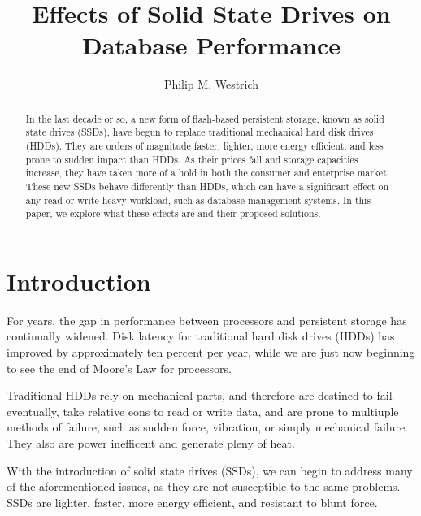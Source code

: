 \documentclass[format=acmsmall, review=false, screen=true]{acmart}
\begin{document}
\title[Effects of SSDs on Databases]{Effects of Solid State Drives on Database Performance}  
\author{Philip M. Westrich}

\begin{abstract}

    In the last decade or so, a new form of flash-based persistent storage, known as solid state drives (SSDs), have begun 
    to replace traditional mechanical hard disk drives (HDDs). They are orders of magnitude faster, lighter, more energy 
    efficient, and less prone to sudden impact than HDDs. As their prices fall and storage capacities increase, they have 
    taken more of a hold in both the consumer and enterprise market. These new SSDs behave differently than HDDs, which can 
    have a significant effect on any read or write heavy workload, such as database management systems. In this paper, we explore 
    what these effects are and their proposed solutions.
 
\end{abstract}

\maketitle

\section{Introduction}

For years, the gap in performance between processors and persistent storage has continually widened. Disk latency for 
traditional hard disk drives (HDDs) has improved by approximately ten percent per year, while we are just now beginning 
to see the end of Moore's Law for processors. \cite{Xie2011}

Traditional HDDs rely on mechanical parts, and therefore are destined to fail eventually, take relative eons to read 
or write data, and are prone to multiuple methods of failure, such as sudden force, vibration, or simply mechanical 
failure. They also are power inefficent and generate pleny of heat. \cite{Xie2011}

With the introduction of solid state drives (SSDs), we can begin to address many of the aforementioned issues, as they 
are not susceptible to the same problems. SSDs are lighter, faster, more energy efficient, and resistant to blunt force.
\cite{Xie2011} 
\end{document}
